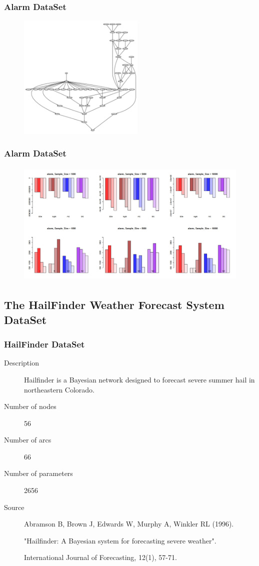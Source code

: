 \documentclass{beamer}
\begin{document}
\begin{frame}
\frametitle{Alarm DataSet}
{\scriptsize{}
	\begin{figure}
		\includegraphics[height=170pt]{images/image03}
	\end{figure}	
}
\end{frame}


\begin{frame}
\frametitle{Alarm DataSet}
{\scriptsize{}
	\begin{figure}
		\includegraphics[height=170pt]{images/Real_3_Alarm}
	\end{figure}			
}
\end{frame}



\subsection{The HailFinder Weather Forecast System DataSet}
\begin{frame}
\frametitle{HailFinder DataSet}
{\scriptsize{}
\begin{description}
	\item[Description] Hailfinder is a Bayesian network designed to forecast severe summer hail in northeastern Colorado.
	
	\item[Number of nodes] 56
	
	\item[Number of arcs] 66
	
	\item[Number of parameters] 2656
	
	\item[Source]  Abramson B, Brown J, Edwards W, Murphy A, Winkler RL (1996).
	
	"Hailfinder: A Bayesian system for forecasting severe weather".
	
	International Journal of Forecasting, 12(1), 57-71.
\end{description}
}
\end{frame}
\end{document}
